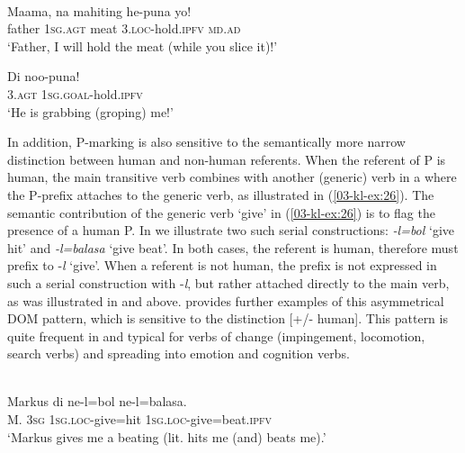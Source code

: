 \documentclass[output=paper]{LSP/langsci}
\begin{document}
\ea {}\\
\ea \label{03-kl-ex:24}
\gll Maama, na mahiting he-puna yo!\\
father 1\textsc{sg}.\textsc{agt} meat 3.\textsc{loc}-hold.\textsc{ipfv} \textsc{md}.\textsc{ad}\\
\glt ‘Father, I will hold the meat (while you slice it)!’

\ex \label{03-kl-ex:25}
\gll Di noo-puna!\\
3.\textsc{agt} 1\textsc{sg}.\textsc{goal}-hold.\textsc{ipfv}\\
\glt ‘He is grabbing (groping) me!'
\z
\z

In addition,  P-marking is also sensitive to the semantically more narrow distinction between human and non-human referents. When the referent of P is human, the main transitive verb combines with another (generic) verb in a  where the P-prefix attaches to the generic verb, as illustrated in (\ref{03-kl-ex:26}). The semantic contribution of the generic verb ‘give’ in (\ref{03-kl-ex:26}) is to flag the presence of a human P. In  we illustrate
two such serial constructions: \textit{-l=bol} ‘give hit’ and
\textit{-l=balasa} ‘give beat’. In both cases, the referent is human,
therefore must prefix to -\textit{l} ‘give’. When a referent is not
human, the prefix is not expressed in such a serial construction with
-\textit{l}, but rather attached directly to the main verb, as was
illustrated in  and  above. \citet[567--569]{Kratochvil2014Differential} provides further examples of this asymmetrical DOM pattern, which is sensitive to the distinction [+/- human]. This pattern is quite frequent in  and typical for verbs of change (impingement, locomotion, search verbs) and spreading into emotion and cognition verbs.

\ea \label{03-kl-ex:26}
\\
\gll Markus di ne-l=bol ne-l=balasa.\\
M. 3\textsc{sg} 1\textsc{sg}.\textsc{loc}-give=hit 1\textsc{sg}.\textsc{loc}-give=beat.\textsc{ipfv}\\
\glt ‘Markus gives me a beating (lit. hits me (and) beats me).' 
\z
\end{document}
